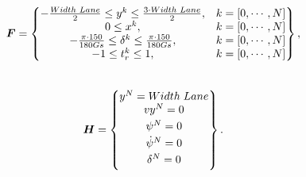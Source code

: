 \begin{equation}\label{eq:F}
\bm{F} =
\begin{Bmatrix}
-\frac{Width\hspace{1mm}Lane}{2} \leq y^k \leq \frac{3\cdot Width\hspace{1mm}Lane}{2}, & k = [0,\cdots, N] \\
0 \leq x^k, & k = [0,\cdots, N] \\
-\frac{\pi\cdot 150}{180 Gs} \leq \delta^k \leq \frac{\pi\cdot 150}{180 Gs}, & k = [0,\cdots, N] \\
-1 \leq t_r^k \leq 1, & k = [0,\cdots, N]

\end{Bmatrix},
\end{equation}\\

\begin{equation}\label{eq:H}
\bm{H} =
\begin{Bmatrix}
y^N = Width\hspace{1mm}Lane \\ \vspace{1mm}
vy^N = 0 \\\vspace{1mm}
\psi^N = 0 \\\vspace{1mm}
\dot{\psi}^N = 0 \\\vspace{1mm}
\delta^N = 0 

\end{Bmatrix}.
\end{equation}\vspace{5mm}

